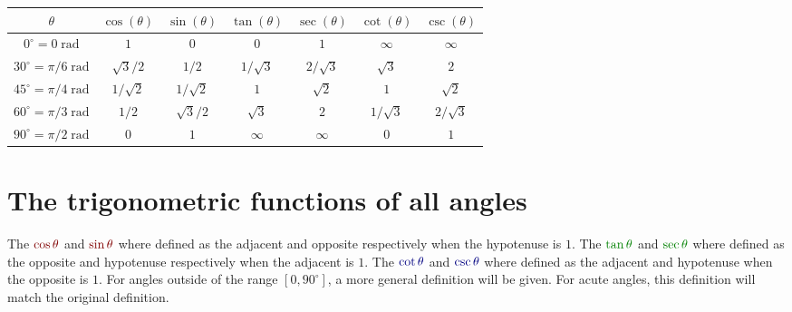 \documentclass{article}
\newcommand{\dr}[1]{\textcolor{dark_red}{#1}}
\newcommand{\dg}[1]{\textcolor{dark_green}{#1}}
\newcommand{\db}[1]{\textcolor{dark_blue}{#1}}
\begin{document}
\begin{tabular}{|c||c|c||c|c||c|c|}
\hline
\(\theta\) & \(\cos(\theta)\) & \(\sin(\theta)\) & \(\tan(\theta)\) & \(\sec(\theta)\) & \(\cot(\theta)\) & \(\csc(\theta)\) \\
\hline
\hline
\(0^\circ = 0\;\text{rad}\) & \(1\) & \(0\) & \(0\) & \(1\) & \(\infty\) & \(\infty\) \\
\hline
\(30^\circ = \pi/6\;\text{rad}\) & \(\sqrt{3}/2\) & \(1/2\) & \(1/\sqrt{3}\) & \(2/\sqrt{3}\) & \(\sqrt{3}\) & \(2\) \\
\hline
\(45^\circ = \pi/4\;\text{rad}\) & \(1/\sqrt{2}\) & \(1/\sqrt{2}\) & \(1\) & \(\sqrt{2}\) & \(1\) & \(\sqrt{2}\) \\
\hline
\(60^\circ = \pi/3\;\text{rad}\) & \(1/2\) & \(\sqrt{3}/2\) & \(\sqrt{3}\) & \(2\) & \(1/\sqrt{3}\) & \(2/\sqrt{3}\) \\
\hline
\(90^\circ = \pi/2\;\text{rad}\) & \(0\) & \(1\) & \(\infty\) & \(\infty\) & \(0\) & \(1\) \\
\hline
\end{tabular}





\section{The trigonometric functions of all angles}

The \(\dr{\cos\theta}\) and \(\dr{\sin\theta}\) where defined as the adjacent and opposite respectively when the hypotenuse is \(1\). The \(\dg{\tan\theta}\) and \(\dg{\sec\theta}\) where defined as the opposite and hypotenuse respectively when the adjacent is \(1\). The \(\db{\cot\theta}\) and \(\db{\csc\theta}\) where defined as the adjacent and hypotenuse when the opposite is \(1\). For angles outside of the range \([0, 90^\circ]\), a more general definition will be given. For acute angles, this definition will match the original definition. 
\end{document}
